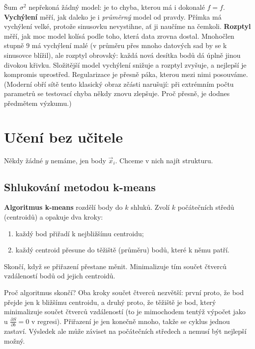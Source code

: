 Šum $\sigma^2$ nepřekoná žádný model: je to chyba, kterou má i dokonalé $\hat{f} = f$. \textbf{Vychýlení} měří, jak daleko je i \textit{průměrný} model od pravdy. Přímka má vychýlení velké, protože sinusovku nevystihne, ať ji naučíme na čemkoli. \textbf{Rozptyl} měří, jak moc model kolísá podle toho, která data zrovna dostal. Mnohočlen stupně $9$ má vychýlení malé (v průměru přes mnoho datových sad by se k sinusovce blížil), ale rozptyl obrovský: každá nová desítka bodů dá úplně jinou divokou křivku. Složitější model vychýlení snižuje a rozptyl zvyšuje, a nejlepší je kompromis uprostřed. Regularizace je přesně páka, kterou mezi nimi posouváme. (Moderní obří sítě tento klasický obraz zčásti narušují: při extrémním počtu parametrů se testovací chyba někdy znovu zlepšuje. Proč přesně, je dodnes předmětem výzkumu.)

\section{Učení bez učitele}

Někdy žádné $y$ nemáme, jen body $\vec{x}_i$. Chceme v nich najít strukturu.

\subsection{Shlukování metodou k-means}

\begin{definitionbox}
  \textbf{Algoritmus k-means} rozdělí body do $k$ shluků. Zvolí $k$ počátečních středů (centroidů) a opakuje dva kroky:
  \begin{enumerate}
    \item každý bod přiřadí k nejbližšímu centroidu;
    \item každý centroid přesune do těžiště (průměru) bodů, které k němu patří.
  \end{enumerate}
  Skončí, když se přiřazení přestane měnit. Minimalizuje tím součet čtverců vzdáleností bodů od jejich centroidů.
\end{definitionbox}

Proč algoritmus skončí? Oba kroky součet čtverců nezvětší: první proto, že bod přejde jen k bližšímu centroidu, a druhý proto, že těžiště je bod, který minimalizuje součet čtverců vzdáleností (to je mimochodem tentýž výpočet jako u $\frac{\partial S}{\partial b} = 0$ v regresi). Přiřazení je jen konečně mnoho, takže se cyklus jednou zastaví. Výsledek ale může záviset na počátečních středech a nemusí být nejlepší možný.

